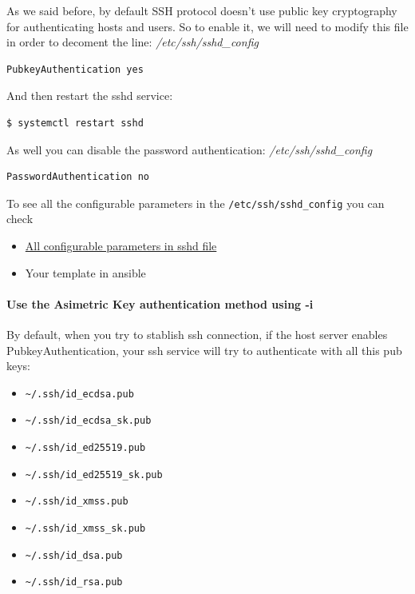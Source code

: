 \documentclass{article}
\newenvironment{blocktemplateII}[1]{%
    \tcolorbox[beamer,%
    noparskip,breakable,
    colframe=Green,%
    colbacklower=LimeGreen!75!LightGreen,%
    title=#1]}%
    {\endtcolorbox}
\newenvironment{codetemplate}[1][]{%
  \mybasecolorbox[#1]
  \itshape
}{%
  \endmybasecolorbox
}
\begin{document}
As we said before, by default SSH protocol doesn't use public key cryptography for authenticating hosts and users. So to enable it, we will need to modify this file in order to decoment the line:
\begin{codetemplate}{/etc/ssh/sshd\_config}
\begin{verbatim}
PubkeyAuthentication yes
\end{verbatim}
\end{codetemplate}

And then restart the sshd service:
\begin{codetemplate}{}
\begin{verbatim}
$ systemctl restart sshd
\end{verbatim}
\end{codetemplate}

\begin{blocktemplateII}{NOTE}
As well you can disable the password authentication:
\begin{codetemplate}{/etc/ssh/sshd\_config}
\begin{verbatim}
PasswordAuthentication no
\end{verbatim}
\end{codetemplate}
\end{blocktemplateII}

To see all the configurable parameters in the \verb|/etc/ssh/sshd_config| you can check

\begin{itemize}
    \item \href{https://www.ssh.com/academy/ssh/sshd_config}{All configurable parameters in sshd file}
    \item Your template in ansible
\end{itemize}


\paragraph{Use the Asimetric Key authentication method using -i}

By default, when you try to stablish ssh connection, if the host server enables PubkeyAuthentication, your ssh service will try to authenticate with all this pub keys:
\begin{itemize}
    \item \verb|~/.ssh/id_ecdsa.pub|
    \item \verb|~/.ssh/id_ecdsa_sk.pub|
    \item \verb|~/.ssh/id_ed25519.pub|
    \item \verb|~/.ssh/id_ed25519_sk.pub|
    \item \verb|~/.ssh/id_xmss.pub|
    \item \verb|~/.ssh/id_xmss_sk.pub|
    \item \verb|~/.ssh/id_dsa.pub|
    \item \verb|~/.ssh/id_rsa.pub|
\end{itemize}
\end{document}
